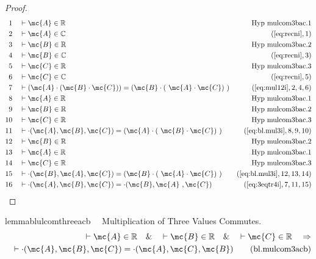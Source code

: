 \begin{proof}
\begin{align}
  1 &&  & \vdash \mc{A} \in
\mathbb{R}&\text{Hyp~mulcom3bac.1}\notag%
  \\ 2 &&  & \vdash \mc{A} \in \mathbb{C}&(\mbox{\ref{eq:recni}},1)\notag
  \\ 3 &&  & \vdash \mc{B} \in
\mathbb{R}&\text{Hyp~mulcom3bac.2}\notag%
  \\ 4 &&  & \vdash \mc{B} \in \mathbb{C}&(\mbox{\ref{eq:recni}},3)\notag
  \\ 5 &&  & \vdash \mc{C} \in
\mathbb{R}&\text{Hyp~mulcom3bac.3}\notag%
  \\ 6 &&  & \vdash \mc{C} \in \mathbb{C}&(\mbox{\ref{eq:recni}},5)\notag
  \\ 7 &&  & \vdash ( \mc{A} \cdot ( \mc{B} \cdot \mc{C} ) ) = ( \mc{B} \cdot (
     ~\mc{A} \cdot \mc{C} )
     ~)&(\mbox{\ref{eq:mul12i}},2,4,6)\notag
  \\ 8 &&  & \vdash \mc{A} \in
\mathbb{R}&\text{Hyp~mulcom3bac.1}\notag%
  \\ 9 &&  & \vdash \mc{B} \in
\mathbb{R}&\text{Hyp~mulcom3bac.2}\notag%
  \\ 10 &&  & \vdash \mc{C} \in
\mathbb{R}&\text{Hyp~mulcom3bac.3}\notag%
  \\ 11 &&  & \vdash \cdot( \mc{A} , \mc{B} , \mc{C} ) = ( \mc{A} \cdot (
     ~\mc{B} \cdot \mc{C} )
     ~)&(\mbox{\ref{eq:bl.mul3i}},8,9,10)\notag
  \\ 12 &&  & \vdash \mc{B} \in
\mathbb{R}&\text{Hyp~mulcom3bac.2}\notag%
  \\ 13 &&  & \vdash \mc{A} \in
\mathbb{R}&\text{Hyp~mulcom3bac.1}\notag%
  \\ 14 &&  & \vdash \mc{C} \in
\mathbb{R}&\text{Hyp~mulcom3bac.3}\notag%
  \\ 15 &&  & \vdash \cdot( \mc{B} , \mc{A} , \mc{C} ) = ( \mc{B} \cdot (
     ~\mc{A} \cdot \mc{C} )
     ~)&(\mbox{\ref{eq:bl.mul3i}},12,13,14)\notag
  \\ 16 &&  & \vdash \cdot( \mc{A} , \mc{B} , \mc{C} ) = \cdot( \mc{B} , \mc{A}
     ~, \mc{C} )&(\mbox{\ref{eq:3eqtr4i}},7,11,15)\notag
\end{align}
\end{proof}

\begin{restatable}{lemma}{blulcomthreeacb}~~ Multiplication of Three Values
Commutes.
\begin{align}
\vdash \mc{A} \in \mathbb{R}\quad\&\quad \vdash \mc{B} \in
    \mathbb{R}\quad\&\quad \vdash \mc{C} \in \mathbb{R}\quad\Rightarrow \notag \\ 
	\quad
    \vdash \cdot( \mc{A} , \mc{B} , \mc{C} ) = \cdot( \mc{A} , \mc{C} , \mc{B}
    )\label{eq:bl.mulcom3acb}\tag{bl.mulcom3acb}
\end{align}
\end{restatable}

